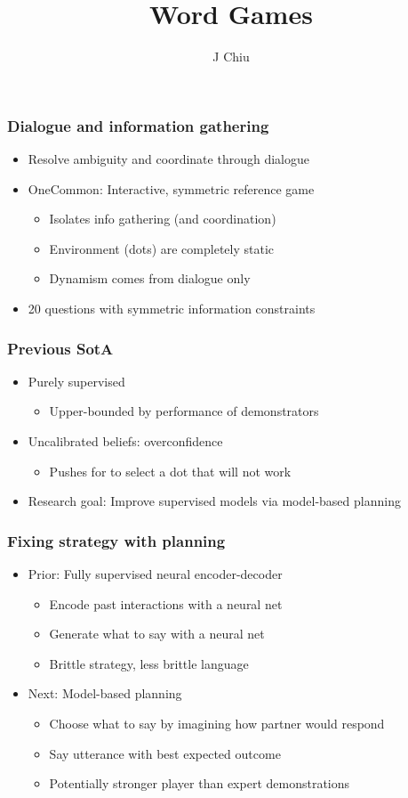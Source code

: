 \documentclass{beamer}
\title{Word Games}
\author{J Chiu}
\begin{document}
\begin{frame}[plain]
\titlepage
\end{frame}

\begin{frame}
\frametitle{Dialogue and information gathering}
\begin{itemize}
\item Resolve ambiguity and coordinate through dialogue
\item OneCommon: Interactive, symmetric reference game
    \begin{itemize}
    \item Isolates info gathering (and coordination)
    \item Environment (dots) are completely static
    \item Dynamism comes from dialogue only
    \end{itemize}
\item 20 questions with symmetric information constraints
\end{itemize}
\end{frame}

\begin{frame}
\frametitle{Previous SotA}
\begin{itemize}
\item Purely supervised
    \begin{itemize}
    \item Upper-bounded by performance of demonstrators
    \end{itemize}
\item Uncalibrated beliefs: overconfidence
    \begin{itemize}
    \item Pushes for to select a dot that will not work
    \end{itemize}
\item Research goal: Improve supervised models via model-based planning
\end{itemize}
\end{frame}


\begin{frame}
\frametitle{Fixing strategy with planning}
\begin{itemize}
\item Prior: Fully supervised neural encoder-decoder
    \begin{itemize}
    \item Encode past interactions with a neural net
    \item Generate what to say with a neural net
    \item Brittle strategy, less brittle language
    \end{itemize}
\item Next: Model-based planning
    \begin{itemize}
    \item Choose what to say by imagining how partner would respond
    \item Say utterance with best expected outcome
    \item Potentially stronger player than expert demonstrations
    \end{itemize}
\end{itemize}
\end{frame}
\end{document}
